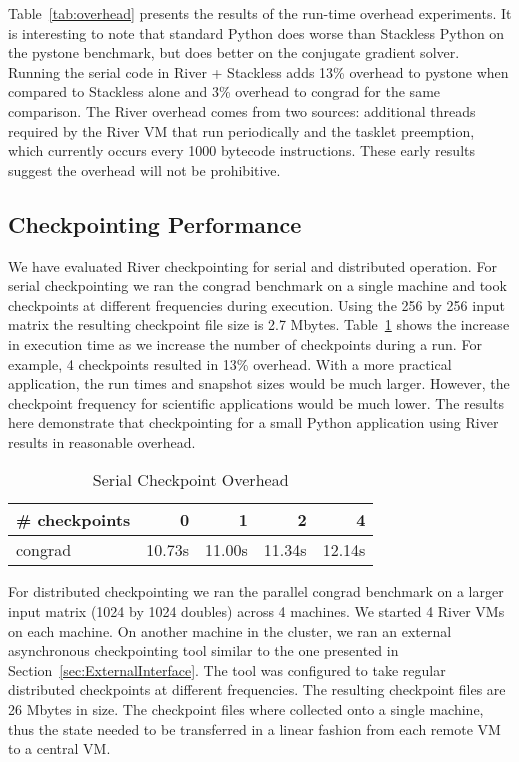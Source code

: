 Table~\ref{tab:overhead} presents the results of the run-time overhead
experiments.  It is interesting to note that standard Python does worse
than Stackless Python on the pystone benchmark, but does better on the
conjugate gradient solver.  Running the serial code in River + Stackless
adds 13\% overhead to pystone when compared to Stackless alone and 3\%
overhead to congrad for the same comparison.  The River overhead comes from
two sources: additional threads required by the River VM that run
periodically and the tasklet preemption, which currently occurs every 1000
bytecode instructions.  These early results suggest the overhead will not
be prohibitive.

\subsection{Checkpointing Performance}

We have evaluated River checkpointing for serial and distributed operation.  For serial checkpointing we ran the congrad benchmark on a single machine and took checkpoints at different frequencies during execution.  Using the 256 by 256 input matrix the resulting checkpoint file size is 2.7 Mbytes.  Table~\ref{tab:checkpointoverhead} shows the increase in execution time as we increase the number of checkpoints during a run.  For example, 4 checkpoints resulted in 13\% overhead.  With a more practical application, the run times and snapshot sizes would be much larger.  However, the checkpoint frequency for scientific applications would be much lower.  The results here demonstrate that checkpointing for a small Python application using River results in reasonable overhead.

\begin{table} [htb]
\begin{center}
\begin{tabular}{|l|r|r|r|r|}  \hline
\# checkpoints &     0  &       1 &   2    & 4 \\ \hline\hline
congrad        & 10.73s &  11.00s &  11.34s & 12.14s \\ \hline
\end{tabular}
\end{center}
\caption{Serial Checkpoint Overhead}
\label{tab:checkpointoverhead}
\end{table}

For distributed checkpointing we ran the parallel congrad benchmark on a
larger input matrix (1024 by 1024 doubles) across 4 machines.  We started 4
River VMs on each machine.  On another machine in the cluster, we ran an
external asynchronous checkpointing tool similar to the one presented in
Section~\ref{sec:ExternalInterface}.  The tool was configured to take
regular distributed checkpoints at different frequencies.  The resulting
checkpoint files are 26 Mbytes in size.  The checkpoint files where
collected onto a single machine, thus the state needed to be transferred in a linear fashion from each remote VM to a central VM. 

